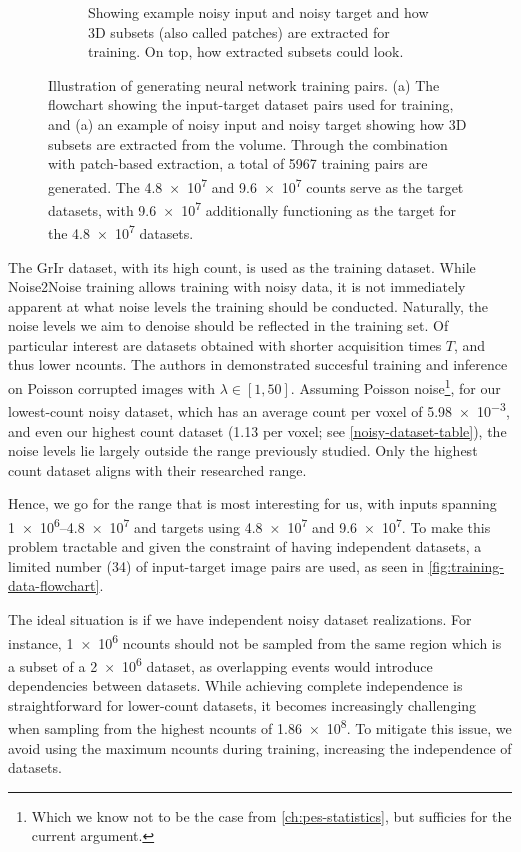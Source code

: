 \begin{figure}[h]
\begin{subfigure}[t]{0.39\linewidth}
        \caption{Showing example noisy input and noisy target and how 3D subsets (also called patches) are extracted for training. On top, how extracted subsets could look.}
        \label{fig:training-3d-patch-example}
    \end{subfigure}
    \caption{Illustration of generating neural network training pairs. (a) The flowchart showing the input-target dataset pairs used for training, and (a) an example of noisy input and noisy target showing how 3D subsets are extracted from the volume. Through the combination with patch-based extraction, a total of \num{5967} training pairs are generated. The \num{4.8e7} and \num{9.6e7} counts serve as the target datasets, with \num{9.6e7} additionally functioning as the target for the \num{4.8e7} datasets.}
\end{figure}
The \gls{GrIr} dataset, with its high count, is used as the training dataset. While Noise2Noise training allows training with noisy data, it is not immediately apparent at what noise levels the training should be conducted. Naturally, the noise levels we aim to denoise should be reflected in the training set. Of particular interest are datasets obtained with shorter acquisition times $T$, and thus lower \gls{ncounts}. The authors in \cite{lehtinenNoise2NoiseLearningImage2018} demonstrated succesful training and inference on Poisson corrupted images with $\lambda \in [1, 50]$. Assuming Poisson noise\footnote{Which we know not to be the case from \cref{ch:pes-statistics}, but 
sufficies for the current argument.}, for our lowest-count noisy dataset, which has an average count per voxel of \num{5.98e-3}, and even our highest count dataset (\num{1.13} per voxel; see \cref{noisy-dataset-table}), the noise levels lie largely outside the range previously studied. Only the highest count dataset aligns with their researched range.

Hence, we go for the range that is most interesting for us, with inputs spanning \numrange{1e6}{4.8e7} and targets using \num{4.8e7} and \num{9.6e7}. To make this problem tractable and given the constraint of having independent datasets, a limited number (\num{34}) of input-target image pairs are used, as seen in \cref{fig:training-data-flowchart}. 

The ideal situation is if we have independent noisy dataset realizations. For instance, \num{1e6} \gls{ncounts} should not be sampled from the same region which is a subset of a \num{2e6} dataset, as overlapping events would introduce dependencies between datasets. While achieving complete independence is straightforward for lower-count datasets, it becomes increasingly challenging when sampling from the highest \gls{ncounts} of \num{1.86e8}. To mitigate this issue, we avoid using the maximum \gls{ncounts} during training, increasing the independence of datasets. 

